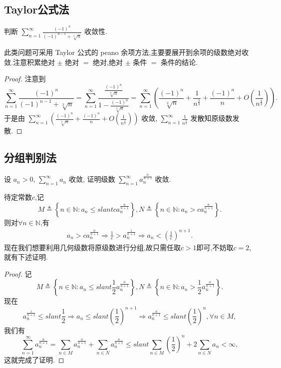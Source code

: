 \documentclass[../../main.tex]{subfiles}
\begin{document}
\subsection{Taylor公式法}

\begin{example}
判断 $\sum_{n=1}^{\infty} \frac{(-1)^n}{(-1)^{n - 1} + \sqrt[3]{n}}$ 收敛性.
\end{example}
\begin{note}
此类问题可采用 Taylor 公式的 peano 余项方法,主要要展开到余项的级数绝对收敛.注意积累绝对 $\pm$ 绝对 $=$ 绝对,绝对 $\pm$ 条件 $=$ 条件的结论.
\end{note}
\begin{proof}
注意到
\[
\sum_{n=1}^{\infty} \frac{(-1)^n}{(-1)^{n - 1} + \sqrt[3]{n}} = \sum_{n=1}^{\infty} \frac{\frac{(-1)^n}{\sqrt[3]{n}}}{1 - \frac{(-1)^n}{\sqrt[3]{n}}} = \sum_{n=1}^{\infty} \left( \frac{(-1)^n}{\sqrt[3]{n}} + \frac{1}{n^{\frac{2}{3}}} + \frac{(-1)^n}{n} + O \left( \frac{1}{n^{\frac{4}{3}}} \right) \right).
\]
于是由 $\sum_{n=1}^{\infty} \left( \frac{(-1)^n}{\sqrt[3]{n}} + \frac{(-1)^n}{n} + O \left( \frac{1}{n^{\frac{4}{3}}} \right) \right)$ 收敛, $\sum_{n=1}^{\infty} \frac{1}{n^{\frac{2}{3}}}$ 发散知原级数发散.
\end{proof}



\subsection{分组判别法}

\begin{example}
设 $a_n > 0$, $\sum_{n=1}^{\infty} a_n$ 收敛, 证明级数 $\sum_{n=1}^{\infty} a_n^{\frac{n}{n + 1}}$ 收敛.
\end{example}
\begin{note}
待定常数$c$,记
\[
M\triangleq \left\{ n\in \mathbb{N} :a_n\leqslant slant ca_{n}^{\frac{n}{n+1}} \right\} ,N\triangleq \left\{ n\in \mathbb{N} :a_n>ca_{n}^{\frac{n}{n+1}} \right\} .
\]
则对$\forall n\in \mathbb{N}$,有
\begin{align*}
a_n>ca_{n}^{\frac{n}{n+1}}\Rightarrow \frac{1}{c}>a_{n}^{\frac{1}{n+1}} \Rightarrow a_n<\left( \frac{1}{c} \right) ^{n+1}.
\end{align*}
现在我们想要利用几何级数将原级数进行分组,故只需任取$c>1$即可,不妨取$c=2$,就有下述证明.
\end{note}
\begin{proof}
记
\[
M \triangleq \left\{ n \in \mathbb{N} : a_n \leqslant slant \frac{1}{2} a_n^{\frac{n}{n + 1}} \right\}, N \triangleq \left\{ n \in \mathbb{N} : a_n > \frac{1}{2} a_n^{\frac{n}{n + 1}} \right\}.
\]
现在
\[
a_n^{\frac{1}{n + 1}} \leqslant slant \frac{1}{2} \Rightarrow a_n \leqslant slant \left( \frac{1}{2} \right)^{n + 1} \Rightarrow a_n^{\frac{n}{n + 1}} \leqslant slant \left( \frac{1}{2} \right)^n, \forall n \in M,
\]
我们有
\[
\sum_{n=1}^{\infty} a_n^{\frac{n}{n + 1}} = \sum_{n \in M} a_n^{\frac{n}{n + 1}} + \sum_{n \in N} a_n^{\frac{n}{n + 1}} \leqslant slant \sum_{n \in M} \left( \frac{1}{2} \right)^n + 2 \sum_{n \in N} a_n < \infty,
\]
这就完成了证明.
\end{proof}
\end{document}
